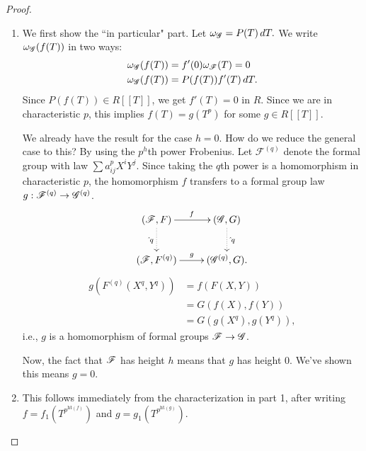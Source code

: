 \begin{proof}
\begin{enumerate}
\item
We first show the ``in particular" part. Let $\omega_{\mathscr G}=P(T)\,dT.$
We write $\omega_{\mathscr G}(f(T))$ in two ways: 
\begin{align*}
\omega_{\mathscr G}(f(T))&=f'(0)\omega_{\mathscr F}(T)=0\\
\omega_{\mathscr G}(f(T))&=P(f(T))f'(T)\,dT.
\end{align*}
Since $P(f(T))\in R[[T]]$, we get $f'(T)=0$ in $R$. Since we are in characteristic $p$, this implies $f(T)=g(T^p)$ for some $g\in R[[T]]$.

We already have the result for the case $h=0$. How do we reduce the general case to this? By using the $p^h$th power Frobenius. Let $\mathscr F^{(q)}$ denote the formal group with law $\sum a_{ij}^pX^iY^j$. 
Since taking the $q$th power is a homomorphism in characteristic $p$, the homomorphism $f$ transfers to a formal group law $g:\mathscr{F}^{(q)}\to \mathscr{G}^{(q)}$.
\[
\xymatrix{
(\cF,F)\ar[r]^f\ar@{.>}[d]_{\hat{\,}q}&(\cG,G)\ar@{.>}[d]^{\hat{\,}q}\\
(\cF,F^{(q)})\ar[r]^g & (\cG^{(q)},G).
}
\]
\begin{align*}
g(F^{(q)}(X^q,Y^q))&= f(F(X,Y))\\
&=G(f(X),f(Y))\\
& = G(g(X^q),g(Y^q)),
\end{align*}
i.e., $g$ is a homomorphism of formal groups $\mathscr{F}\to \mathscr{G}$.

Now, the fact that $\mathscr{F}$ has height $h$ means that $g$ has height 0. We've shown this means $g=0$.
\item
This follows immediately from the characterization in part 1, after writing $f=f_1(T^{p^{\text{ht}(f)}})$ and $g=g_1(T^{p^{\text{ht}(g)}})$.
\end{enumerate}
\end{proof}

